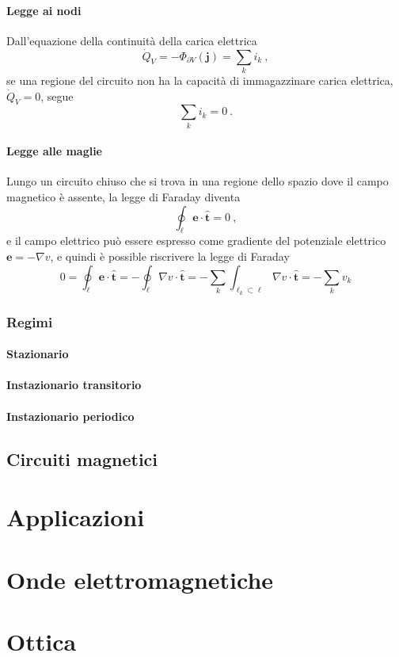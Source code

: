 \subsubsection{Legge ai nodi}
Dall'equazione della continuità della carica elettrica
\begin{equation}
    \dot{Q}_V = - \Phi_{\partial V}(\mathbf{j}) = \sum_k i_k \ ,
\end{equation}
se una regione del circuito non ha la capacità di immagazzinare carica elettrica, $\dot{Q}_V = 0$, segue
\begin{equation}
    \sum_k i_k = 0 \ .
\end{equation}

\subsubsection{Legge alle maglie}
Lungo un circuito chiuso che si trova in una regione dello spazio dove il campo magnetico è assente, la legge di Faraday diventa
\begin{equation}
    \oint_{\ell} \mathbf{e} \cdot \mathbf{\hat{t}} = 0 \ , 
\end{equation}
e il campo elettrico può essere espresso come gradiente del potenziale elettrico $\mathbf{e} = - \nabla v$, e quindi è possible riscrivere la legge di Faraday
\begin{equation}
    0 = \oint_{\ell} \mathbf{e} \cdot \mathbf{\hat{t}} = - \oint_{\ell} \nabla v \cdot \mathbf{\hat{t}} = - \sum_k \int_{\ell_k \subset \ell} \nabla v \cdot \mathbf{\hat{t}} = - \sum_k v_k
\end{equation}

\subsection{Regimi}
\subsubsection{Stazionario}
\subsubsection{Instazionario transitorio}
\subsubsection{Instazionario periodico}

\section{Circuiti magnetici}

\chapter{Applicazioni}

\chapter{Onde elettromagnetiche}

\chapter{Ottica}
